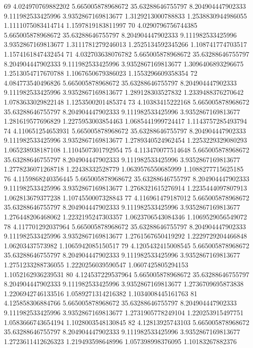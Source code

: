 {69 4.024970769882202 5.665005878968672 35.63288646755797 8.204904447902333 9.111982533425996 3.9352867169813677 1.3129213000788833 1.2538830944986055 1.1111075083414714 1.1597819183811997
70 4.0290796756744385 5.665005878968672 35.63288646755797 8.204904447902333 9.111982533425996 3.9352867169813677 1.3111781279246013 1.2525134592345266 1.108741774703517 1.1574161847432454
71 4.032703638076782 5.665005878968672 35.63288646755797 8.204904447902333 9.111982533425996 3.9352867169813677 1.3096406893296675 1.2513054717670788 1.1067650679386023 1.1553296609358354
72 4.084773540496826 5.665005878968672 35.63288646755797 8.204904447902333 9.111982533425996 3.9352867169813677 1.289128303527832 1.2339488376270642 1.0783633029822148 1.1253500201485374
73 4.10383415222168 5.665005878968672 35.63288646755797 8.204904447902333 9.111982533425996 3.9352867169813677 1.281619577696829 1.2275953003854463 1.0685441999724417 1.1143757285493794
74 4.110651254653931 5.665005878968672 35.63288646755797 8.204904447902333 9.111982533425996 3.9352867169813677 1.2789340524962454 1.2253229329080293 1.065238938187108 1.1104507301792954
75 4.113470077514648 5.665005878968672 35.63288646755797 8.204904447902333 9.111982533425996 3.9352867169813677 1.2778236071268718 1.22438332528779 1.0639576550685999 1.1088277715625185
76 4.1159868240356445 5.665005878968672 35.63288646755797 8.204904447902333 9.111982533425996 3.9352867169813677 1.2768321615276914 1.2235444097807913 1.062813679377238 1.1074550007328843
77 4.116961479187012 5.665005878968672 35.63288646755797 8.204904447902333 9.111982533425996 3.9352867169813677 1.276448206468062 1.2232195247303357 1.0623706543084346 1.1069529056549072
78 4.117701292037964 5.665005878968672 35.63288646755797 8.204904447902333 9.111982533425996 3.9352867169813677 1.2761567650419292 1.2229729204466848 1.06203437573982 1.1065942085150517
79 4.1205432415008545 5.665005878968672 35.63288646755797 8.204904447902333 9.111982533425996 3.9352867169813677 1.2751233288736055 1.2220256039590547 1.0607425805294153 1.1052162936239531
80 4.124537229537964 5.665005878968672 35.63288646755797 8.204904447902333 9.111982533425996 3.9352867169813677 1.2736709695873838 1.2206942746133516 1.0589271314216382 1.1034008445161763
81 4.125858306884766 5.665005878968672 35.63288646755797 8.204904447902333 9.111982533425996 3.9352867169813677 1.2731905778249104 1.220253915497751 1.0583666743654194 1.1028003548130845
82 4.12813925743103 5.665005878968672 35.63288646755797 8.204904447902333 9.111982533425996 3.9352867169813677 1.2723611412626323 1.219493598648996 1.057398998376095 1.10183267882376
}

